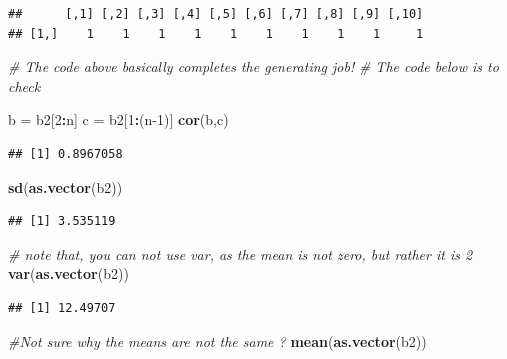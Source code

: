 \documentclass[
]{book}
\newenvironment{Shaded}{\begin{snugshade}}{\end{snugshade}}
\newcommand{\CommentTok}[1]{\textcolor[rgb]{0.56,0.35,0.01}{\textit{#1}}}
\newcommand{\DecValTok}[1]{\textcolor[rgb]{0.00,0.00,0.81}{#1}}
\newcommand{\KeywordTok}[1]{\textcolor[rgb]{0.13,0.29,0.53}{\textbf{#1}}}
\newcommand{\NormalTok}[1]{#1}
\newcommand{\OperatorTok}[1]{\textcolor[rgb]{0.81,0.36,0.00}{\textbf{#1}}}
\newcommand{\StringTok}[1]{\textcolor[rgb]{0.31,0.60,0.02}{#1}}
\begin{document}
\begin{verbatim}
##      [,1] [,2] [,3] [,4] [,5] [,6] [,7] [,8] [,9] [,10]
## [1,]    1    1    1    1    1    1    1    1    1     1
\end{verbatim}

\begin{Shaded}
\begin{Highlighting}[]
\CommentTok{# The code above basically completes the generating job! }
\CommentTok{# The code below is to check }

\NormalTok{b =}\StringTok{ }\NormalTok{b2[}\DecValTok{2}\OperatorTok{:}\NormalTok{n]}
\NormalTok{c =}\StringTok{ }\NormalTok{b2[}\DecValTok{1}\OperatorTok{:}\NormalTok{(n}\DecValTok{-1}\NormalTok{)]}
\KeywordTok{cor}\NormalTok{(b,c)   }
\end{Highlighting}
\end{Shaded}

\begin{verbatim}
## [1] 0.8967058
\end{verbatim}

\begin{Shaded}
\begin{Highlighting}[]
\KeywordTok{sd}\NormalTok{(}\KeywordTok{as.vector}\NormalTok{(b2))}
\end{Highlighting}
\end{Shaded}

\begin{verbatim}
## [1] 3.535119
\end{verbatim}

\begin{Shaded}
\begin{Highlighting}[]
\CommentTok{# note that, you can not use var, as the mean is not zero, but rather it is 2}
\KeywordTok{var}\NormalTok{(}\KeywordTok{as.vector}\NormalTok{(b2))}
\end{Highlighting}
\end{Shaded}

\begin{verbatim}
## [1] 12.49707
\end{verbatim}

\begin{Shaded}
\begin{Highlighting}[]
\CommentTok{#Not sure why the means are not the same ?}
\KeywordTok{mean}\NormalTok{(}\KeywordTok{as.vector}\NormalTok{(b2))}
\end{Highlighting}
\end{Shaded}
\end{document}
